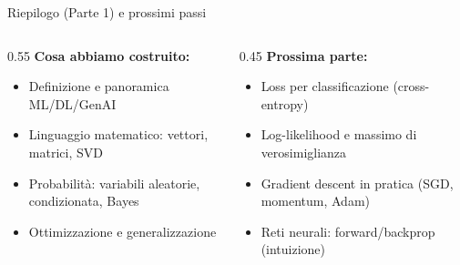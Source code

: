 \documentclass[aspectratio=169, 10pt]{beamer}
\begin{document}
\begin{frame}{Riepilogo (Parte 1) e prossimi passi}
    \begin{columns}[T]
        \begin{column}{0.55\textwidth}
            \textbf{Cosa abbiamo costruito:}
            \begin{itemize}
                \item Definizione e panoramica ML/DL/GenAI
                \item Linguaggio matematico: vettori, matrici, SVD
                \item Probabilità: variabili aleatorie, condizionata, Bayes
                \item Ottimizzazione e generalizzazione
            \end{itemize}
        \end{column}
        \begin{column}{0.45\textwidth}
            \textbf{Prossima parte:}
            \begin{itemize}
                \item Loss per classificazione (cross-entropy)
                \item Log-likelihood e massimo di verosimiglianza
                \item Gradient descent in pratica (SGD, momentum, Adam)
                \item Reti neurali: forward/backprop (intuizione)
            \end{itemize}
        \end{column}
    \end{columns}
\end{frame}
\end{document}
